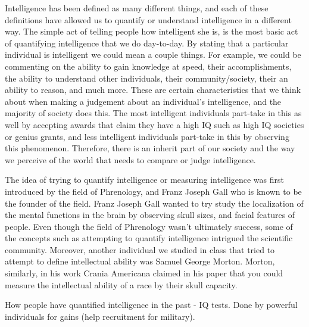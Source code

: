 \documentclass[11pt, oneside]{article}
\begin{document}
\par Intelligence has been defined as many different things, and each of these definitions have allowed us to quantify or understand intelligence in a different way. The simple act of telling people how intelligent she is, is the most basic act of quantifying intelligence that we do day-to-day. By stating that a particular individual is intelligent we could mean a couple things. For example, we could be commenting on the ability to gain knowledge at speed, their accomplishments, the ability to understand other individuals, their community/society, their an ability to reason, and much more. 
These are certain characteristics that we think about when making a judgement about an individual's intelligence, and the majority of society does this. The most intelligent individuals part-take in this as well by accepting awards that claim they have a high IQ such as high IQ societies or genius grants, and less intelligent individuals part-take in this by observing this phenomenon. Therefore, there is an inherit part of our society and the way we perceive of the world that needs to compare or judge intelligence.
\par The idea of trying to quantify intelligence or measuring intelligence was first introduced by the field of Phrenology, and Franz Joseph Gall who is known to be the founder of the field. Franz Joseph Gall wanted to try study the localization of the mental functions in the brain by observing skull sizes, and facial features of people. Even though the field of Phrenology wasn't ultimately success, some of the concepts such as attempting to quantify intelligence intrigued the scientific community. Moreover, another individual we studied in class that tried to attempt to define intellectual ability was Samuel George Morton. Morton, similarly, in his work Crania Americana claimed in his paper that you could measure the intellectual ability of a race by their skull capacity. 

\par How people have quantified intelligence in the past - IQ tests. Done by powerful individuals for gains (help recruitment for military).
\end{document}
